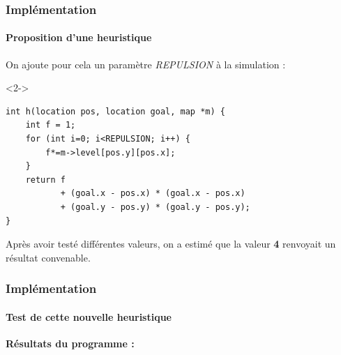 \begin{frame}[fragile]
    \frametitle{Implémentation}
    \framesubtitle{Proposition d'une heuristique}
    On ajoute pour cela un paramètre \textit{REPULSION} à la simulation :
    \begin{onslide}<2->
        \begin{code}
            \begin{verbatim}
int h(location pos, location goal, map *m) {
    int f = 1;
    for (int i=0; i<REPULSION; i++) {
        f*=m->level[pos.y][pos.x];
    }
    return f
           + (goal.x - pos.x) * (goal.x - pos.x)
           + (goal.y - pos.y) * (goal.y - pos.y);
}
    \end{verbatim}
        \end{code}
        Après avoir testé différentes valeurs, on a estimé que la valeur \textbf{4} renvoyait un résultat convenable.
    \end{onslide}


\end{frame}


\begin{frame}
    \frametitle{Implémentation}
    \framesubtitle{Test de cette nouvelle heuristique}
    \textbf{Résultats du programme :} \\
    \begin{figure}
    \end{figure}
\end{frame}


